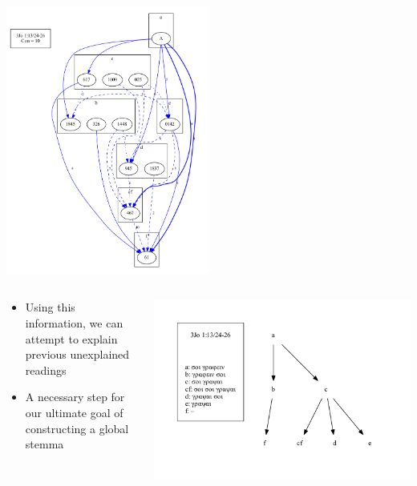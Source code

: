 \documentclass[10pt]{beamer}
\begin{document}
	\begin{frame}
		\begin{center}
			\includegraphics[width=0.5\textwidth]{../img/B25K1V13U24-26-coherence-variants-strengths.pdf}
		\end{center}
	\end{frame}
	\begin{frame}
		\begin{columns}
			\begin{column}{0.45\textwidth}
				\begin{itemize}
					\item Using this information, we can attempt to explain previous unexplained readings
					\item A necessary step for our ultimate goal of constructing a global stemma
				\end{itemize}
			\end{column}
			\begin{column}{0.45\textwidth}
				\begin{center}
					\includegraphics[width=\textwidth]{../img/B25K1V13U24-26-local-stemma-complete.pdf}
				\end{center}
			\end{column}
		\end{columns}
	\end{frame}
\end{document}
